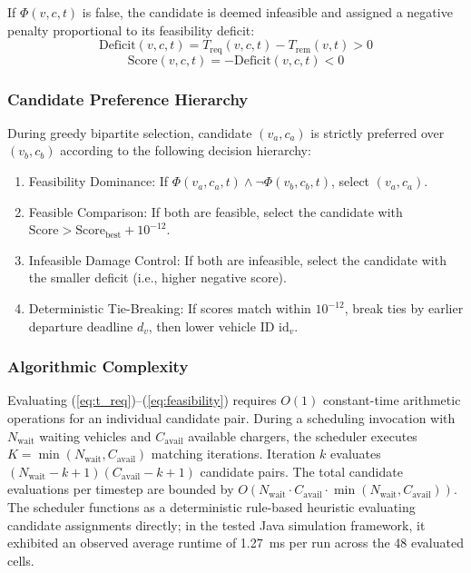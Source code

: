 \documentclass[conference]{IEEEtran}
\begin{document}
If $\Phi(v, c, t)$ is false, the candidate is deemed infeasible and assigned a negative penalty proportional to its feasibility deficit:
\begin{equation}
\mathrm{Deficit}(v, c, t) = T_{\mathrm{req}}(v, c, t) - T_{\mathrm{rem}}(v, t) > 0
\end{equation}
\begin{equation}
\mathrm{Score}(v, c, t) = -\mathrm{Deficit}(v, c, t) < 0
\end{equation}

\subsubsection{Candidate Preference Hierarchy}
During greedy bipartite selection, candidate $(v_a, c_a)$ is strictly preferred over $(v_b, c_b)$ according to the following decision hierarchy:
\begin{enumerate}
    \item Feasibility Dominance: If $\Phi(v_a, c_a, t) \land \neg \Phi(v_b, c_b, t)$, select $(v_a, c_a)$.
    \item Feasible Comparison: If both are feasible, select the candidate with $\mathrm{Score} > \mathrm{Score}_{\mathrm{best}} + 10^{-12}$.
    \item Infeasible Damage Control: If both are infeasible, select the candidate with the smaller deficit (i.e., higher negative score).
    \item Deterministic Tie-Breaking: If scores match within $10^{-12}$, break ties by earlier departure deadline $d_v$, then lower vehicle ID $\mathrm{id}_v$.
\end{enumerate}

\subsubsection{Algorithmic Complexity}
Evaluating (\ref{eq:t_req})--(\ref{eq:feasibility}) requires $O(1)$ constant-time arithmetic operations for an individual candidate pair. During a scheduling invocation with $N_{\mathrm{wait}}$ waiting vehicles and $C_{\mathrm{avail}}$ available chargers, the scheduler executes $K = \min(N_{\mathrm{wait}}, C_{\mathrm{avail}})$ matching iterations. Iteration $k$ evaluates $(N_{\mathrm{wait}} - k + 1)(C_{\mathrm{avail}} - k + 1)$ candidate pairs. The total candidate evaluations per timestep are bounded by $O(N_{\mathrm{wait}} \cdot C_{\mathrm{avail}} \cdot \min(N_{\mathrm{wait}}, C_{\mathrm{avail}}))$. The scheduler functions as a deterministic rule-based heuristic evaluating candidate assignments directly; in the tested Java simulation framework, it exhibited an observed average runtime of 1.27~ms per run across the 48 evaluated cells.
\end{document}
